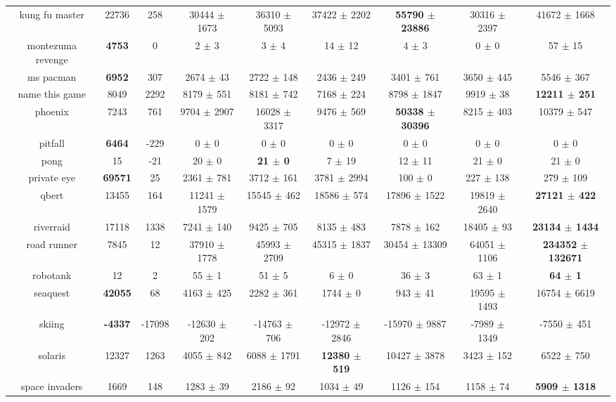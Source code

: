 \documentclass{article}
\begin{document}
\begin{table}[!ht]
\begin{tabular}{|c|c|c|c|c|c|c|c|c|}
 kung fu master & 22736 & 258 & 30444 $\pm$ 1673 & 36310 $\pm$ 5093 & 37422 $\pm$ 2202 & \bf{55790 $\pm$ 23886} & 30316 $\pm$ 2397 & 41672 $\pm$ 1668 \\
 montezuma revenge & \bf{4753} & 0 & 2 $\pm$ 3 & 3 $\pm$ 4 & 14 $\pm$ 12 & 4 $\pm$ 3 & 0 $\pm$ 0 & 57 $\pm$ 15 \\
 ms pacman & \bf{6952} & 307 & 2674 $\pm$ 43 & 2722 $\pm$ 148 & 2436 $\pm$ 249 & 3401 $\pm$ 761 & 3650 $\pm$ 445 & 5546 $\pm$ 367 \\
 name this game & 8049 & 2292 & 8179 $\pm$ 551 & 8181 $\pm$ 742 & 7168 $\pm$ 224 & 8798 $\pm$ 1847 & 9919 $\pm$ 38 & \bf{12211 $\pm$ 251} \\
 phoenix & 7243 & 761 & 9704 $\pm$ 2907 & 16028 $\pm$ 3317 & 9476 $\pm$ 569 & \bf{50338 $\pm$ 30396} & 8215 $\pm$ 403 & 10379 $\pm$ 547 \\
 pitfall & \bf{6464} & -229 & 0 $\pm$ 0 & 0 $\pm$ 0 & 0 $\pm$ 0 & 0 $\pm$ 0 & 0 $\pm$ 0 & 0 $\pm$ 0 \\
 pong & 15 & -21 & 20 $\pm$ 0 & \bf{21 $\pm$ 0} & 7 $\pm$ 19 & 12 $\pm$ 11 & 21 $\pm$ 0 & 21 $\pm$ 0 \\
 private eye & \bf{69571} & 25 & 2361 $\pm$ 781 & 3712 $\pm$ 161 & 3781 $\pm$ 2994 & 100 $\pm$ 0 & 227 $\pm$ 138 & 279 $\pm$ 109 \\
 qbert & 13455 & 164 & 11241 $\pm$ 1579 & 15545 $\pm$ 462 & 18586 $\pm$ 574 & 17896 $\pm$ 1522 & 19819 $\pm$ 2640 & \bf{27121 $\pm$ 422} \\
 riverraid & 17118 & 1338 & 7241 $\pm$ 140 & 9425 $\pm$ 705 & 8135 $\pm$ 483 & 7878 $\pm$ 162 & 18405 $\pm$ 93 & \bf{23134 $\pm$ 1434} \\
 road runner & 7845 & 12 & 37910 $\pm$ 1778 & 45993 $\pm$ 2709 & 45315 $\pm$ 1837 & 30454 $\pm$ 13309 & 64051 $\pm$ 1106 & \bf{234352 $\pm$ 132671} \\
 robotank & 12 & 2 & 55 $\pm$ 1 & 51 $\pm$ 5 & 6 $\pm$ 0 & 36 $\pm$ 3 & 63 $\pm$ 1 & \bf{64 $\pm$ 1} \\
 seaquest & \bf{42055} & 68 & 4163 $\pm$ 425 & 2282 $\pm$ 361 & 1744 $\pm$ 0 & 943 $\pm$ 41 & 19595 $\pm$ 1493 & 16754 $\pm$ 6619 \\
 skiing & \bf{-4337} & -17098 & -12630 $\pm$ 202 & -14763 $\pm$ 706 & -12972 $\pm$ 2846 & -15970 $\pm$ 9887 & -7989 $\pm$ 1349 & -7550 $\pm$ 451 \\
 solaris & 12327 & 1263 & 4055 $\pm$ 842 & 6088 $\pm$ 1791 & \bf{12380 $\pm$ 519} & 10427 $\pm$ 3878 & 3423 $\pm$ 152 & 6522 $\pm$ 750 \\
 space invaders & 1669 & 148 & 1283 $\pm$ 39 & 2186 $\pm$ 92 & 1034 $\pm$ 49 & 1126 $\pm$ 154 & 1158 $\pm$ 74 & \bf{5909 $\pm$ 1318} \\

\end{tabular}
\end{table}
\end{document}

